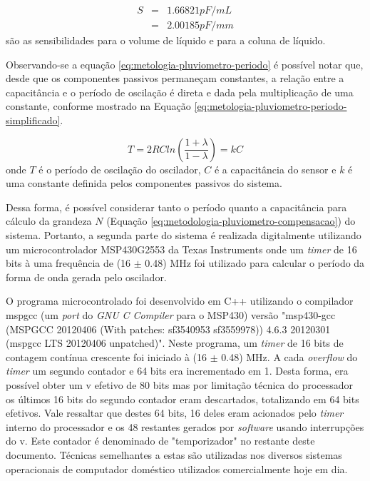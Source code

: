 \documentclass[a4paper]{instrumentacao}
\begin{document}
\begin{eqnarray}
	S &=& 1.66821 pF/mL \\
	  &=& 2.00185 pF/mm \nonumber
	\label{eq:metodologia-pluviometro-teorico-capacitancia-sensibilidade}
\end{eqnarray}
\noindent são as sensibilidades para o volume de líquido e para a coluna de líquido.

Observando-se a equação \ref{eq:metologia-pluviometro-periodo} é possível notar que, desde que os componentes passivos permaneçam constantes, a relação entre a capacitância e o período de oscilação é direta e dada pela multiplicação de uma constante, conforme mostrado na Equação \ref{eq:metologia-pluviometro-periodo-simplificado}.

\begin{equation}
	T = 2 R C ln \left(\frac{1+\lambda}{1-\lambda}\right) = k C
	\label{eq:metologia-pluviometro-periodo-simplificado}
\end{equation}
\noindent onde $T$ é o período de oscilação do oscilador, $C$ é a capacitância do sensor e $k$ é uma constante definida pelos componentes passivos do sistema.

Dessa forma, é possível considerar tanto o período quanto a capacitância para cálculo da grandeza $N$ (Equação \ref{eq:metodologia-pluviometro-compensacao}) do sistema. Portanto, a segunda parte do sistema é realizada digitalmente utilizando um microcontrolador MSP430G2553 da Texas Instruments onde um \textit{timer} de 16 bits à uma frequência de (16 $\pm$ 0.48) MHz foi utilizado para calcular o período da forma de onda gerada pelo oscilador.

O programa microcontrolado foi desenvolvido em C++ utilizando o compilador mspgcc (um \textit{port} do \textit{GNU C Compiler} para o MSP430) versão "msp430-gcc (MSPGCC 20120406 (With patches: sf3540953 sf3559978)) 4.6.3 20120301 (mspgcc LTS 20120406 unpatched)". Neste programa, um \textit{timer} de 16 bits de contagem contínua crescente foi iniciado à (16 $\pm$ 0.48) MHz. A cada \textit{overflow} do \textit{timer} um segundo contador e 64 bits era incrementado em 1. Desta forma, era possível obter um v efetivo de 80 bits mas por limitação técnica do processador os últimos 16 bits do segundo contador eram descartados, totalizando em 64 bits efetivos. Vale ressaltar que destes 64 bits, 16 deles eram acionados pelo \textit{timer} interno do processador e os 48 restantes gerados por \textit{software} usando interrupções do v. Este contador é denominado de "temporizador" no restante deste documento. Técnicas semelhantes a estas são utilizadas nos diversos sistemas operacionais de computador doméstico utilizados comercialmente hoje em dia.
\end{document}
